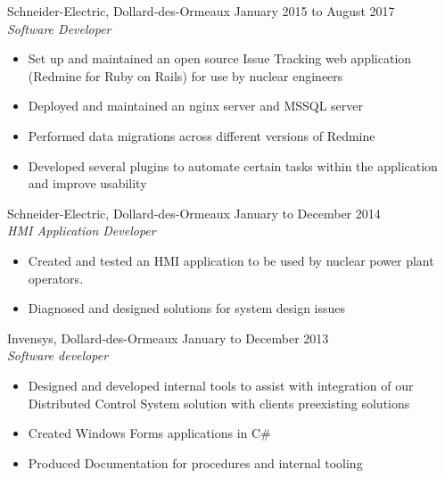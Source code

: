 \documentclass{res}
\newcommand{\inFrench}[1]{}
\newcommand{\inEnglish}[1]{#1}
\begin{document}
\begin{resume}
{	%
	Schneider-Electric, Dollard-des-Ormeaux
	\hfill January 2015 to August 2017 \\
	{\sl Software Developer}
	\vspace{0.05in}

	\begin{itemize} \itemsep -2pt
		\item Set up and maintained an open source Issue Tracking web application (Redmine for Ruby on Rails) for use by nuclear engineers
		\item Deployed and maintained an nginx server and MSSQL server
		\item Performed data migrations across different versions of Redmine
		\item Developed several plugins to automate certain tasks within the application and improve usability
	\end{itemize}

	Schneider-Electric, Dollard-des-Ormeaux
	\hfill January to December 2014 \\
	{\sl HMI Application Developer}
	\vspace{0.05in}

	\begin{itemize} \itemsep -2pt
		\item Created and tested an HMI application to be used by nuclear power plant operators.
		\item Diagnosed and designed solutions for system design issues
	\end{itemize}

	Invensys, Dollard-des-Ormeaux
	\hfill January to December 2013 \\
	{\sl Software developer}
	\vspace{0.05in}

	\begin{itemize} \itemsep -2pt
		\item Designed and developed internal tools to assist with integration of our Distributed Control System solution with clients preexisting solutions
		\item Created Windows Forms applications in C\#
		\item Produced Documentation for procedures and internal tooling
	\end{itemize}
}

\inFrench{
	\section{Connaissances informatiques}
}
\inEnglish{
}
\end{resume}
\end{document}
